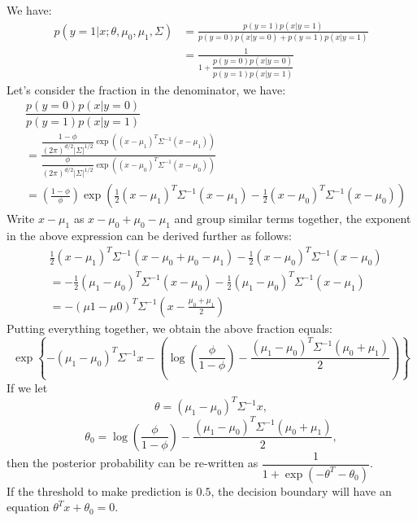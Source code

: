 \begin{answer}	
We have:
%
\begin{align}
	p(y = 1|x; \theta, \mu_0, \mu_1, \Sigma)
	&= \frac{p(y =1)p(x|y = 1)}{p(y = 0)p(x|y = 0) + p(y=1)p(x|y = 1)} \\
	&= \frac{1}{1 + \dfrac{p(y = 0)p(x|y = 0)}{p(y=1)p(x|y = 1)}}
\end{align}
%
Let's consider the fraction in the denominator, we have:
%
\begin{align}
	& \dfrac{p(y = 0)p(x|y = 0)}{p(y=1)p(x|y = 1)} \\
	&= \frac{\dfrac{1 - \phi}{(2\pi)^{d/2}|\Sigma|^{1/2}} \exp((x - \mu_1)^T \Sigma^{-1} (x - \mu_1))}{\dfrac{\phi}{(2\pi)^{d/2}|\Sigma|^{1/2}} \exp((x - \mu_0)^T \Sigma^{-1} (x - \mu_0))} \\
	&= \left(\frac{1 - \phi}{\phi}\right) \exp\left( \frac{1}{2} (x - \mu_1)^T \Sigma^{-1} (x - \mu_1) - \frac{1}{2} (x - \mu_0)^T \Sigma^{-1} (x - \mu_0) \right)
\end{align}
% 
Write $x - \mu_1$ as $x - \mu_0 + \mu_0 - \mu_1$ and group similar terms together, the exponent in the above expression can be derived further as follows:
%
\begin{align}
& \frac{1}{2} (x - \mu_1)^T \Sigma^{-1} (x - \mu_0 + \mu_0 - \mu_1) - \frac{1}{2} (x - \mu_0)^T \Sigma^{-1} (x - \mu_0) \\
&= -\frac{1}{2} (\mu_1 - \mu_0)^T \Sigma^{-1} (x - \mu_0) - \frac{1}{2} (\mu_1 - \mu_0)^T \Sigma^{-1} (x - \mu_1) \\
&= -(\mu1 - \mu0)^T \Sigma^{-1} (x - \frac{\mu_0 + \mu_1}{2})
\end{align}
%
Putting everything together, we obtain the above fraction equals:
$$ \exp\left\{-(\mu_1 - \mu_0)^T \Sigma^{-1}x - \left( \log \left( \frac{\phi}{1 - \phi} \right) - \frac{(\mu_1 - \mu_0)^T \Sigma^{-1} (\mu_0 + \mu_1)}{2} \right) \right\} $$
If we let $$\theta = (\mu_1 - \mu_0)^T \Sigma^{-1}x,$$ $$\theta_0 = \log \left( \dfrac{\phi}{1 - \phi} \right) - \dfrac{(\mu_1 - \mu_0)^T \Sigma^{-1} (\mu_0 + \mu_1)}{2},$$ then the posterior probability can be re-written as $\dfrac{1}{1 + \exp(-\theta^T - \theta_0)}$. \\[2pt]
If the threshold to make prediction is $0.5$, the decision boundary will have an equation $\theta^T x + \theta_0 = 0$. \\
\end{answer}
